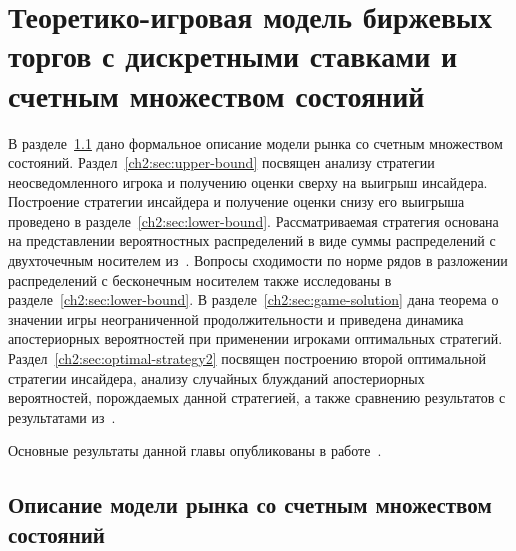 \chapter{Теоретико-игровая модель биржевых торгов с дискретными ставками и счетным множеством состояний} \label{chapt2}
{
\newcommand{\as}[1][\beta]{\ensuremath{a^{s,#1}}}
\newcommand{\s}{\ensuremath{s}}
\newcommand{\q}{\ensuremath{\overbar{q}}}
\newcommand{\theG}[1][n]{\ensuremath{G^\beta_{#1}}}
\newcommand{\K}[1][n]{\ensuremath{K^\beta_{#1}}}
\newcommand{\V}[1][n]{\ensuremath{V^\beta_{#1}}}
\newcommand{\High}[1][\ensuremath{\infty}]{\ensuremath{H^\beta_{#1}}}
\newcommand{\sigmav}{\ensuremath{\overbar{\sigma}}}
\newcommand{\tauv}{\ensuremath{\overbar{\tau}}}
\newcommand{\xiv}{\ensuremath{\overbar{\xi}}}
\newcommand{\sigmak}{\ensuremath{\hat{\sigma}}}
\newcommand{\Low}[1][\ensuremath{\infty}]{\ensuremath{L^\beta_{#1}}}
\newcommand{\norm}[1]{\left\lVert#1\right\rVert}
\newcommand{\LL}{L^1(\{s^2\})}
\newcommand{\LowV}[1][n]{\ensuremath{\underbar{V}^\beta_{#1}}}
\newcommand{\HighV}[1][n]{\ensuremath{\overbar{V}^\beta_{#1}}}
\newcommand{\MM}{\ensuremath{\overline{P}}}

В разделе~\ref{ch2:sec:intro} дано формальное описание модели рынка со счетным множеством состояний.
Раздел~\ref{ch2:sec:upper-bound} посвящен анализу стратегии неосведомленного игрока и получению оценки сверху на выигрыш инсайдера.
Построение стратегии инсайдера и получение оценки снизу его выигрыша проведено в разделе~\ref{ch2:sec:lower-bound}.
Рассматриваемая стратегия основана на представлении вероятностных распределений в виде суммы распределений с двухточечным носителем из~\cite{domansky11}.
Вопросы сходимости по норме рядов в разложении распределений с бесконечным носителем также исследованы в разделе~\ref{ch2:sec:lower-bound}.
В разделе~\ref{ch2:sec:game-solution} дана теорема о значении игры неограниченной продолжительности и приведена динамика апостериорных вероятностей при применении игроками оптимальных стратегий.
Раздел~\ref{ch2:sec:optimal-strategy2} посвящен построению второй оптимальной стратегии инсайдера, анализу случайных блужданий апостериорных вероятностей, порождаемых данной стратегией, а также сравнению результатов с результатами из~\cite{domansky11}.

Основные результаты данной главы опубликованы в работе~\cite{pyanykh:orm2016}.

\section{Описание модели рынка со счетным множеством состояний}
\label{ch2:sec:intro}

}
